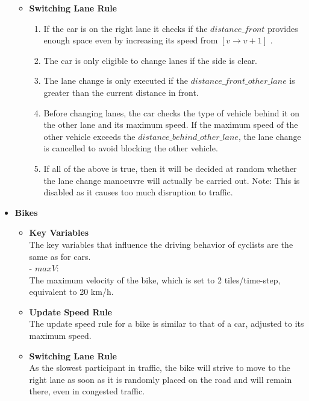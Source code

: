 \begin{itemize}
\begin{itemize}
         \item \textbf{Switching Lane Rule}\\
         \begin{enumerate}
         \item If the car is on the right lane it checks if the $distance\_front$ provides enough space even by increasing its speed from $[v \rightarrow v+1]$ .
         \item The car is only eligible to change lanes if the side is clear.
         \item The lane change is only executed if the $distance\_front\_other\_lane$ is greater than the current distance in front.
         \item Before changing lanes, the car checks the type of vehicle behind it on the other lane and its maximum speed. If the maximum speed of the other vehicle exceeds the $distance\_behind\_other\_lane$, the lane change is cancelled to avoid blocking the other vehicle.
         \item If all of the above is true, then it will be decided at random whether the lane change manoeuvre will actually be carried out. Note: This is disabled as it causes too much disruption to traffic.
         \end{enumerate}     
     \end{itemize}

     \item \textbf{Bikes}
     \begin{itemize}
         \item \textbf{Key Variables}\\
         The key variables that influence the driving behavior of cyclists are the same as for cars.\\
         - $maxV$: \\
         The maximum velocity of the bike, which is set to 2 tiles/time-step, equivalent to 20 km/h.\\
         \item \textbf{Update Speed Rule}\\
         The update speed rule for a bike is similar to that of a car, adjusted to its maximum speed.\\
         \item \textbf{Switching Lane Rule}\\
         As the slowest participant in traffic, the bike will strive to move to the right lane as soon as it is randomly placed on the road and will remain there, even in congested traffic.
     \end{itemize}


\end{itemize}
